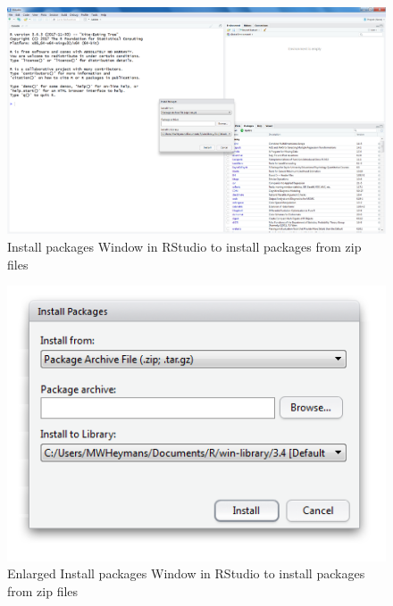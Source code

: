\documentclass[]{book}
\theoremstyle{definition}
\theoremstyle{definition}
\theoremstyle{definition}
\theoremstyle{remark}
\begin{document}
\begin{figure}

{\centering \includegraphics[width=0.9\linewidth]{images/fig1.26a} 

}

\caption{Install packages Window in RStudio to install packages from zip files}\label{fig:fig26a}
\end{figure}

\begin{figure}

{\centering \includegraphics[width=0.9\linewidth]{images/fig1.26b} 

}

\caption{Enlarged Install packages Window in RStudio to install packages from zip files}\label{fig:fig26b}
\end{figure}


\end{document}

